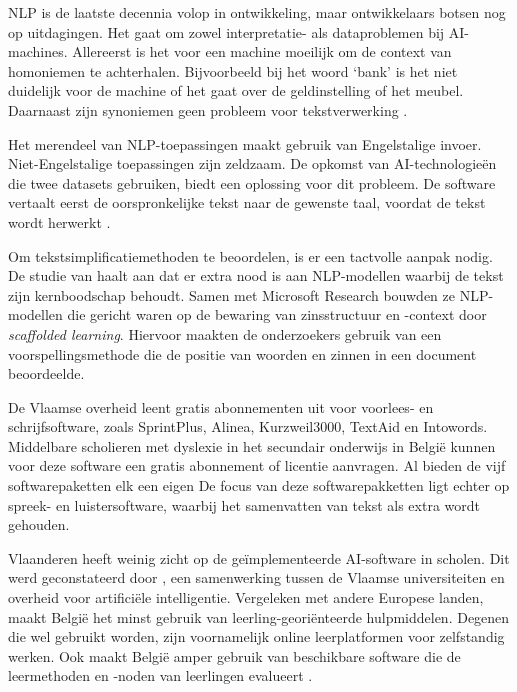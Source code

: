 NLP is de laatste decennia volop in ontwikkeling, maar ontwikkelaars botsen nog op uitdagingen. Het gaat om zowel interpretatie- als dataproblemen bij AI-machines. Allereerst is het voor een machine moeilijk om de context van homoniemen te achterhalen. Bijvoorbeeld bij het woord ‘bank’ is het niet duidelijk voor de machine of het gaat over de geldinstelling of het meubel. Daarnaast zijn synoniemen geen probleem voor tekstverwerking \autocite{Roldos2020}.

Het merendeel van NLP-toepassingen maakt gebruik van Engelstalige invoer. Niet-Engelstalige toepassingen zijn zeldzaam. De opkomst van AI-technologieën die twee datasets gebruiken, biedt een oplossing voor dit probleem. De software vertaalt eerst de oorspronkelijke tekst naar de gewenste taal, voordat de tekst wordt herwerkt \autocite{Sciforce2020}.

Om tekstsimplificatiemethoden te beoordelen, is er een tactvolle aanpak nodig. De studie van \textcite{Swayamdipta2019} haalt aan dat er extra nood is aan NLP-modellen waarbij de tekst zijn kernboodschap behoudt. Samen met Microsoft Research bouwden ze NLP-modellen die gericht waren op de bewaring van zinsstructuur en -context door \emph{scaffolded learning}. Hiervoor maakten de onderzoekers gebruik van een voorspellingsmethode die de positie van woorden en zinnen in een document beoordeelde.

De Vlaamse overheid leent gratis abonnementen uit voor voorlees- en schrijfsoftware, zoals \newline SprintPlus, Alinea, Kurzweil3000, TextAid en Intowords. Middelbare scholieren met dyslexie in het secundair onderwijs in België kunnen voor deze software een gratis abonnement of licentie aanvragen. Al bieden de vijf softwarepaketten elk een eigen De focus van deze softwarepakketten ligt echter op spreek- en luistersoftware, waarbij het samenvatten van tekst als extra wordt gehouden.

Vlaanderen heeft weinig zicht op de geïmplementeerde AI-software in scholen. Dit werd geconstateerd door \autocite{Martens2021}, een samenwerking tussen de Vlaamse universiteiten en overheid voor artificiële intelligentie. Vergeleken met andere Europese landen, maakt België het minst gebruik van leerling-georiënteerde hulpmiddelen. Degenen die wel gebruikt worden, zijn voornamelijk online leerplatformen voor zelfstandig werken. Ook maakt België amper gebruik van beschikbare software die de leermethoden en -noden van leerlingen evalueert \autocite{Martens2021a}. 


